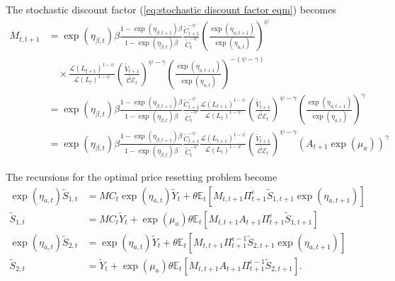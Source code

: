 \documentclass[12 pt, oneside]{article}
\theoremstyle{definition}
\theoremstyle{definition}
\theoremstyle{definition}
\newcommand{\E}{\mathbb{E}}
\newcommand{\calC}{\mathcal{C}}
\newcommand{\calE}{\mathcal{E}}
\newcommand{\calL}{\mathcal{L}}
\begin{document}
The stochastic discount factor (\ref{eq:stochastic discount factor eqm}) becomes
\begin{align*}
  M_{t, t + 1} & = \exp(\eta_{\beta, t})\beta \frac{1 - \exp(\eta_{\beta, t + 1})\beta}{1 - \exp(\eta_{\beta, t})\beta} \frac{\tilde{C}_{t + 1}^{ - \psi}}{\tilde{C}_t^{ - \psi}}\left(\frac{\exp(\eta_{a, t + 1})}{\exp(\eta_{a, t})}\right)^\psi \\
               &\quad\times\frac{\calL(L_{t + 1})^{1 - \psi}}{\calL(L_t)^{1 - \psi}}\left(\frac{\tilde{V}_{t + 1}}{\tilde{\calC\calE}_t}\right)^{\psi - \gamma}\left(\frac{\exp(\eta_{a, t + 1})}{\exp(\eta_{a, t})}\right)^{-(\psi - \gamma)}\\
               & = \exp(\eta_{\beta, t})\beta \frac{1 - \exp(\eta_{\beta, t + 1})\beta}{1 - \exp(\eta_{\beta, t})\beta} \frac{\tilde{C}_{t + 1}^{ - \psi}}{\tilde{C}_t^{ - \psi}}\frac{\calL(L_{t + 1})^{1 - \psi}}{\calL(L_t)^{1 - \psi}}\left(\frac{\tilde{V}_{t + 1}}{\tilde{\calC\calE}_t}\right)^{\psi - \gamma}\left(\frac{\exp(\eta_{a, t + 1})}{\exp(\eta_{a, t})}\right)^{\gamma}\\
               & = \exp(\eta_{\beta, t})\beta \frac{1 - \exp(\eta_{\beta, t + 1})\beta}{1 - \exp(\eta_{\beta, t})\beta} \frac{\tilde{C}_{t + 1}^{ - \psi}}{\tilde{C}_t^{ - \psi}}\frac{\calL(L_{t + 1})^{1 - \psi}}{\calL(L_t)^{1 - \psi}}\left(\frac{\tilde{V}_{t + 1}}{\tilde{\calC\calE}_t}\right)^{\psi - \gamma}(A_{t + 1}\exp(\mu_a))^\gamma
\end{align*}

The recursions for the optimal price resetting problem become
\begin{align*}
  \exp(\eta_{a, t})\tilde{S}_{1, t} & = MC_t\exp(\eta_{a, t})\tilde{Y}_t + \theta\E_t[M_{t, t + 1}\Pi_{t + 1}^\epsilon \tilde{S}_{1, t + 1}\exp(\eta_{a, t + 1})]\\
  \tilde{S}_{1, t} & = MC_t \tilde{Y}_t + \exp(\mu_a)\theta\E_t[M_{t, t + 1}A_{t + 1}\Pi_{t + 1}^\epsilon \tilde{S}_{1, t + 1}]\\
  \exp(\eta_{a, t})\tilde{S}_{2, t} & = \exp(\eta_{a, t})\tilde{Y}_t + \theta\E_t[M_{t, t + 1}\Pi_{t + 1}^{\epsilon - 1} \tilde{S}_{2, t + 1}\exp(\eta_{a, t + 1})]\\
\tilde{S}_{2, t} & = \tilde{Y}_t + \exp(\mu_a)\theta\E_t[M_{t, t + 1}A_{t + 1}\Pi_{t + 1}^{\epsilon - 1} \tilde{S}_{2, t + 1}].
\end{align*}
\end{document}
